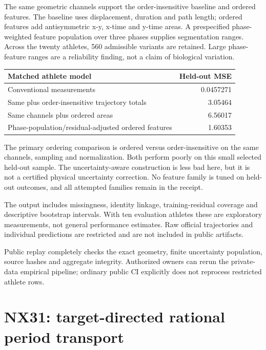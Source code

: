 \documentclass[
  11pt,
  a4paper,
]{report}
\begin{document}
The same geometric channels support the order-insensitive baseline and
ordered features. The baseline uses displacement, duration and path
length; ordered features add antisymmetric x-y, x-time and y-time areas.
A prespecified phase-weighted feature population over three phases
supplies segmentation ranges. Across the twenty athletes, 560 admissible
variants are retained. Large phase-feature ranges are a reliability
finding, not a claim of biological variation.

\begin{longtable}[]{@{}lr@{}}
\toprule\noalign{}
Matched athlete model & Held-out MSE \\
\midrule\noalign{}
\endhead
\bottomrule\noalign{}
\endlastfoot
Conventional measurements & 0.0457271 \\
Same plus order-insensitive trajectory totals & 3.05464 \\
Same channels plus ordered areas & 6.56017 \\
Phase-population/residual-adjusted ordered features & 1.60353 \\
\end{longtable}

The primary ordering comparison is ordered versus order-insensitive on
the same channels, sampling and normalization. Both perform poorly on
this small selected held-out sample. The uncertainty-aware construction
is less bad here, but it is not a certified physical uncertainty
correction. No feature family is tuned on held-out outcomes, and all
attempted families remain in the receipt.

The output includes missingness, identity linkage, training-residual
coverage and descriptive bootstrap intervals. With ten evaluation
athletes these are exploratory measurements, not general performance
estimates. Raw official trajectories and individual predictions are
restricted and are not included in public artifacts.

Public replay completely checks the exact geometry, finite uncertainty
population, source hashes and aggregate integrity. Authorized owners can
rerun the private-data empirical pipeline; ordinary public CI explicitly
does not reprocess restricted athlete rows.

\hypertarget{nx31-target-directed-rational-period-transport}{%
\chapter{NX31: target-directed rational period
transport}\label{nx31-target-directed-rational-period-transport}}
\end{document}
